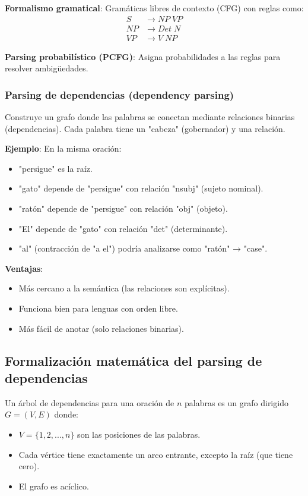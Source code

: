 \documentclass[12pt,a4paper,openany,oneside]{book}
\begin{document}
\textbf{Formalismo gramatical}: Gramáticas libres de contexto (CFG) con reglas como:
\begin{align*}
    S &\to NP \; VP \\
    NP &\to Det \; N \\
    VP &\to V \; NP
\end{align*}

\textbf{Parsing probabilístico (PCFG)}: Asigna probabilidades a las reglas para resolver ambigüedades.

\subsubsection{Parsing de dependencias (dependency parsing)}
Construye un grafo donde las palabras se conectan mediante relaciones binarias (dependencias). Cada palabra tiene un "cabeza" (gobernador) y una relación.

\textbf{Ejemplo}: En la misma oración:
\begin{itemize}
    \item "persigue" es la raíz.
    \item "gato" depende de "persigue" con relación "nsubj" (sujeto nominal).
    \item "ratón" depende de "persigue" con relación "obj" (objeto).
    \item "El" depende de "gato" con relación "det" (determinante).
    \item "al" (contracción de "a el") podría analizarse como "ratón" → "case".
\end{itemize}

\textbf{Ventajas}:
\begin{itemize}
    \item Más cercano a la semántica (las relaciones son explícitas).
    \item Funciona bien para lenguas con orden libre.
    \item Más fácil de anotar (solo relaciones binarias).
\end{itemize}

\subsection{Formalización matemática del parsing de dependencias}
Un árbol de dependencias para una oración de \(n\) palabras es un grafo dirigido \( G = (V, E) \) donde:
\begin{itemize}
    \item \( V = \{1, 2, ..., n\} \) son las posiciones de las palabras.
    \item Cada vértice tiene exactamente un arco entrante, excepto la raíz (que tiene cero).
    \item El grafo es acíclico.
\end{itemize}
\end{document}

